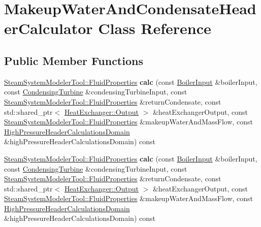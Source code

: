\hypertarget{class_makeup_water_and_condensate_header_calculator}{}\section{Makeup\+Water\+And\+Condensate\+Header\+Calculator Class Reference}
\label{class_makeup_water_and_condensate_header_calculator}
\subsection*{Public Member Functions}
\begin{DoxyCompactItemize}
\item 
\mbox{\label{class_makeup_water_and_condensate_header_calculator_a38c092c32d7588c4e6782cd778553c40}} 
\hyperlink{struct_steam_system_modeler_tool_1_1_fluid_properties}{Steam\+System\+Modeler\+Tool\+::\+Fluid\+Properties} {\bfseries calc} (const \hyperlink{class_boiler_input}{Boiler\+Input} \&boiler\+Input, const \hyperlink{class_condensing_turbine}{Condensing\+Turbine} \&condensing\+Turbine\+Input, const \hyperlink{struct_steam_system_modeler_tool_1_1_fluid_properties}{Steam\+System\+Modeler\+Tool\+::\+Fluid\+Properties} \&return\+Condensate, const std\+::shared\+\_\+ptr$<$ \hyperlink{struct_heat_exchanger_1_1_output}{Heat\+Exchanger\+::\+Output} $>$ \&heat\+Exchanger\+Output, const \hyperlink{struct_steam_system_modeler_tool_1_1_fluid_properties}{Steam\+System\+Modeler\+Tool\+::\+Fluid\+Properties} \&makeup\+Water\+And\+Mass\+Flow, const \hyperlink{class_high_pressure_header_calculations_domain}{High\+Pressure\+Header\+Calculations\+Domain} \&high\+Pressure\+Header\+Calculations\+Domain) const
\item 
\mbox{\label{class_makeup_water_and_condensate_header_calculator_a38c092c32d7588c4e6782cd778553c40}} 
\hyperlink{struct_steam_system_modeler_tool_1_1_fluid_properties}{Steam\+System\+Modeler\+Tool\+::\+Fluid\+Properties} {\bfseries calc} (const \hyperlink{class_boiler_input}{Boiler\+Input} \&boiler\+Input, const \hyperlink{class_condensing_turbine}{Condensing\+Turbine} \&condensing\+Turbine\+Input, const \hyperlink{struct_steam_system_modeler_tool_1_1_fluid_properties}{Steam\+System\+Modeler\+Tool\+::\+Fluid\+Properties} \&return\+Condensate, const std\+::shared\+\_\+ptr$<$ \hyperlink{struct_heat_exchanger_1_1_output}{Heat\+Exchanger\+::\+Output} $>$ \&heat\+Exchanger\+Output, const \hyperlink{struct_steam_system_modeler_tool_1_1_fluid_properties}{Steam\+System\+Modeler\+Tool\+::\+Fluid\+Properties} \&makeup\+Water\+And\+Mass\+Flow, const \hyperlink{class_high_pressure_header_calculations_domain}{High\+Pressure\+Header\+Calculations\+Domain} \&high\+Pressure\+Header\+Calculations\+Domain) const

\end{DoxyCompactItemize}
